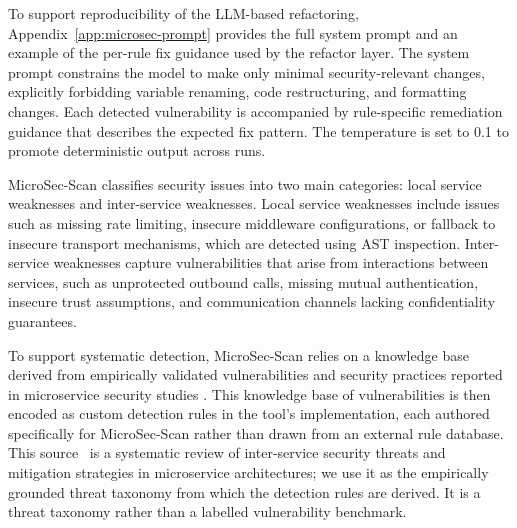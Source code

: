 \documentclass[preprint,12pt]{elsarticle}
\newcommand{\new}[1]{#1}
\begin{document}
To support reproducibility of the LLM-based refactoring, Appendix~\ref{app:microsec-prompt} provides the full system prompt and an example of the per-rule fix guidance used by the refactor layer. The system prompt constrains the model to make only minimal security-relevant changes, explicitly forbidding variable renaming, code restructuring, and formatting changes. Each detected vulnerability is accompanied by rule-specific remediation guidance that describes the expected fix pattern. The temperature is set to 0.1 to promote deterministic output across runs.

MicroSec-Scan classifies security issues into two main categories: local service weaknesses and inter-service weaknesses. Local service weaknesses include issues such as missing rate limiting, insecure middleware configurations, or fallback to insecure transport mechanisms, which are detected using AST inspection. Inter-service weaknesses capture vulnerabilities that arise from interactions between services, such as unprotected outbound calls, missing mutual authentication, insecure trust assumptions, and communication channels lacking confidentiality guarantees.

To support systematic detection, MicroSec-Scan relies on a \new{knowledge base derived from empirically validated vulnerabilities} and security practices reported in microservice security studies \cite{haindl2024systematic}. \new{This knowledge base of vulnerabilities is then encoded as custom
detection rules in the tool's implementation, each authored specifically for
MicroSec-Scan rather than drawn from an external rule database.} \new{This source~\cite{haindl2024systematic} is a systematic review of inter-service security threats and mitigation strategies in microservice architectures; we use it as the empirically grounded threat taxonomy from which the detection rules are derived. It is a threat taxonomy rather than a labelled vulnerability benchmark.}
\end{document}
